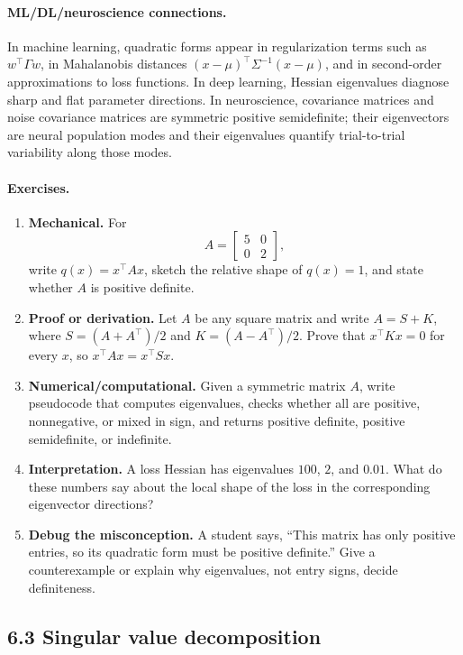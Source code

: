 \paragraph{ML/DL/neuroscience connections.}
In machine learning, quadratic forms appear in regularization terms such as \(w^\top \Gamma w\), in Mahalanobis distances \((x-\mu)^\top\Sigma^{-1}(x-\mu)\), and in second-order approximations to loss functions. In deep learning, Hessian eigenvalues diagnose sharp and flat parameter directions. In neuroscience, covariance matrices and noise covariance matrices are symmetric positive semidefinite; their eigenvectors are neural population modes and their eigenvalues quantify trial-to-trial variability along those modes.

\paragraph{Exercises.}
\begin{enumerate}[label=\textbf{6.2.\arabic*.}, leftmargin=*]
\item \textbf{Mechanical.} For
\[
A=\begin{bmatrix}5&0\\0&2\end{bmatrix},
\]
write \(q(x)=x^\top A x\), sketch the relative shape of \(q(x)=1\), and state whether \(A\) is positive definite.
\item \textbf{Proof or derivation.} Let \(A\) be any square matrix and write \(A=S+K\), where \(S=(A+A^\top)/2\) and \(K=(A-A^\top)/2\). Prove that \(x^\top Kx=0\) for every \(x\), so \(x^\top A x=x^\top Sx\).
\item \textbf{Numerical/computational.} Given a symmetric matrix \(A\), write pseudocode that computes eigenvalues, checks whether all are positive, nonnegative, or mixed in sign, and returns positive definite, positive semidefinite, or indefinite.
\item \textbf{Interpretation.} A loss Hessian has eigenvalues \(100\), \(2\), and \(0.01\). What do these numbers say about the local shape of the loss in the corresponding eigenvector directions?
\item \textbf{Debug the misconception.} A student says, ``This matrix has only positive entries, so its quadratic form must be positive definite.'' Give a counterexample or explain why eigenvalues, not entry signs, decide definiteness.
\end{enumerate}

\subsection{6.3 Singular value decomposition}

